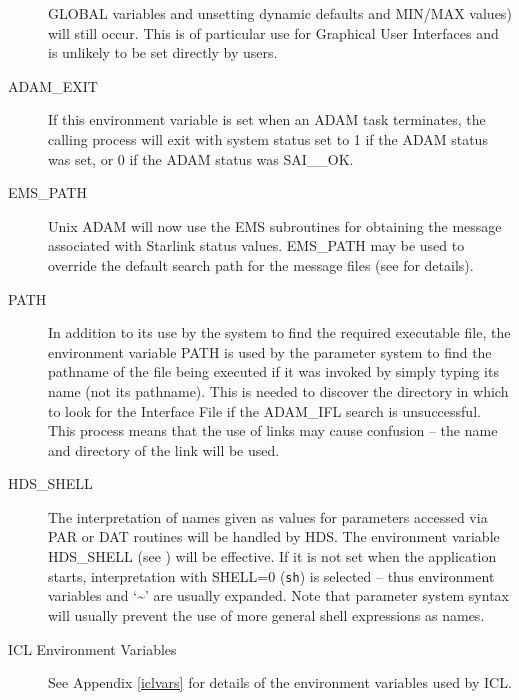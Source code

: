 \documentclass[twoside,11pt,nolof]{starlink}
\begin{document}
\begin{description}
GLOBAL variables and unsetting dynamic defaults and MIN/MAX values) will still
occur.
This is of particular use for Graphical User Interfaces and is unlikely
to be set directly by users.
\item[ADAM\_EXIT] If this environment variable is set when an ADAM task
terminates, the calling process will exit with system status set to 1 if
the ADAM status was set, or 0 if the ADAM status was SAI\_\_OK.
\item[EMS\_PATH] Unix ADAM will now use the EMS subroutines for obtaining the
message associated with Starlink status values. EMS\_PATH may be used to
override the default search path for the message files
(see
for details).
\item[PATH] In addition to its use by the system to find the required
executable file, the environment variable PATH is used by the parameter
system to find the pathname of the file being executed if it was invoked by
simply typing its name (not its pathname).
This is needed to discover the directory in which to look for the Interface
File if the ADAM\_IFL search is unsuccessful.
This process means that the use of links may cause confusion -- the name
and directory of the link will be used.
\item[HDS\_SHELL] The interpretation of names given as values for parameters
accessed via PAR or DAT routines will be handled by HDS.
The environment variable HDS\_SHELL
(see
)
will be effective.
If it is not set when the application starts, interpretation with SHELL=0
(\texttt{sh}) is selected
-- thus environment variables and `\~{}' are usually expanded.
Note that parameter system syntax will usually prevent the use of more general
shell expressions as names.
\item[ICL Environment Variables] See Appendix \ref{iclvars} for details of the
environment variables used by ICL.
\end{description}
\end{document}
